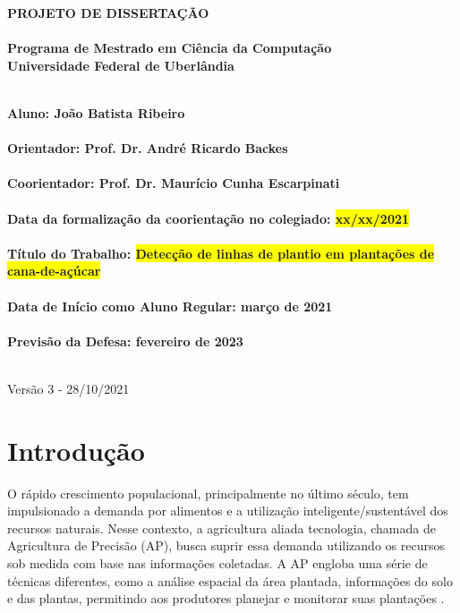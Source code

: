 \documentclass[12pt, a4paper, english, brazil]{article}
\newcommand{\textRed}[1]{{{\color{red} #1}}}
\begin{document}
\rhead{\thepage}

\begin{center}
	\bf{\LARGE{PROJETO DE DISSERTAÇÃO}\\ $\ $\\}
	\Large{Programa de Mestrado em Ciência da Computação\\
		Universidade Federal de Uberlândia}\\ $\ $\\
\end{center}

\begin{center}
	\bf{Aluno: João Batista Ribeiro\\ $\ $\\
		Orientador: Prof. Dr. André Ricardo Backes\\ $\ $\\
		Coorientador: Prof. Dr. Maurício Cunha Escarpinati\\ $\ $\\
		Data da formalização da coorientação no colegiado: \colorbox{yellow}{xx/xx/2021}\\ $\ $\\
		Título do Trabalho: \colorbox{yellow}{Detecção de linhas de plantio em plantações de cana-de-açúcar}\\ $\ $\\
		Data de Início como Aluno Regular: março de 2021\\ $\ $\\
		Previsão da Defesa: fevereiro de 2023\\ $\ $\\}
\end{center}

\textRed{Versão 3 - 28/10/2021}

\section{Introdução}

O rápido crescimento populacional, principalmente no último século, tem impulsionado a demanda por alimentos e a utilização inteligente/sustentável dos recursos naturais. Nesse contexto, a agricultura aliada tecnologia, chamada de Agricultura de Precisão (AP), busca suprir essa demanda utilizando os recursos sob medida com base nas informações coletadas. A AP engloba uma série de técnicas diferentes, como a análise espacial da área plantada, informações do solo e das plantas, permitindo aos produtores planejar e monitorar suas plantações \cite{Blasch_2020}.
\end{document}
